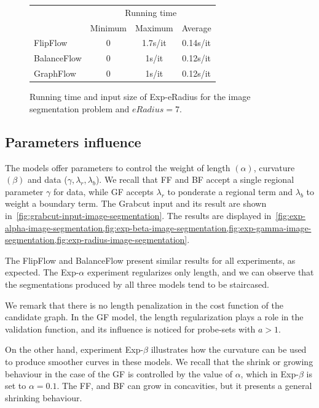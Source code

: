 \begin{figure}
\center
\captionsetup{type=table}
\begin{tabular}{|l|c|c|c|}
\hline
& \multicolumn{3}{|c|}{Running time}\\
& Minimum & Maximum & Average \\
\hline
FlipFlow & 0 & 1.7s/it & 0.14s/it\\
BalanceFlow & 0 & 1s/it & 0.12s/it\\
GraphFlow & 0 & 1s/it & 0.12s/it\\
\hline
\end{tabular}
\caption{Running time and input size of Exp-eRadius for the image segmentation problem and $eRadius=7$.}
\label{tab:rtime-image-segmentation-general} 
\end{figure}

\subsection{Parameters influence}
The models offer parameters to control the weight of length $(\alpha)$, curvature $(\beta)$ and data ($\gamma,\lambda _r, \lambda _b$). We recall that FF and BF accept a single regional parameter $\gamma$ for data, while GF accepts $\lambda _r$ to ponderate a regional term and $\lambda _b$ to weight a boundary term. The Grabcut input and its result are shown in~\cref{fig:grabcut-input-image-segmentation}. The results are displayed in~\cref{fig:exp-alpha-image-segmentation,fig:exp-beta-image-segmentation,fig:exp-gamma-image-segmentation,fig:exp-radius-image-segmentation}. 

The FlipFlow and BalanceFlow present similar results for all experiments, as expected. The Exp-$\alpha$ experiment regularizes only length, and we can observe that the segmentations produced by all three models tend to be staircased. 

We remark that there is no length penalization in the cost function of the candidate graph. In the GF model, the length regularization plays a role in the validation function, and its influence is noticed for probe-sets with $a>1$. 

On the other hand, experiment Exp-$\beta$ illustrates how the curvature can be used to produce smoother curves in these models. We recall that the shrink or growing behaviour in the case of the GF is controlled by the value of $\alpha$, which in Exp-$\beta$ is set to $\alpha=0.1$. The FF, and BF can grow in concavities, but it presents a general shrinking behaviour.

